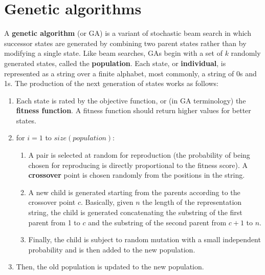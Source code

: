 \section{Genetic algorithms}
A \textbf{genetic algorithm} (or GA) is a variant of stochastic beam search in which successor states are generated by combining two parent states rather than by modifying a single state.\newline\newline
Like beam searches, GAs begin with a set of $k$ randomly generated states, called the \textbf{population}. Each state, or \textbf{individual}, is represented as a string over a finite alphabet, most commonly, a string of 0s and 1s. The production of the next generation of states works as follows:
\begin{enumerate}
    \item Each state is rated by the objective function, or (in GA terminology) the \textbf{fitness function}. A fitness function should return higher values for better states.

    \item for $i=1$ to $size(population)$:

    \begin{enumerate}
        \item A pair is selected at random for reproduction (the probability of being chosen for reproducing is directly proportional to the fitness score). A \textbf{crossover} point is chosen randomly from the positions in the string.

        \item A new child is generated starting from the parents according to the crossover point $c$. Basically, given $n$ the length of the representation string, the child is generated concatenating the substring of the first parent from 1 to $c$ and the substring of the second parent from $c + 1$ to $n$.

        \item Finally, the child is subject to random mutation with a small independent probability and is then added to the new population. 
    \end{enumerate}
     \item Then, the old population is updated to the new population.
    
    
\end{enumerate}



